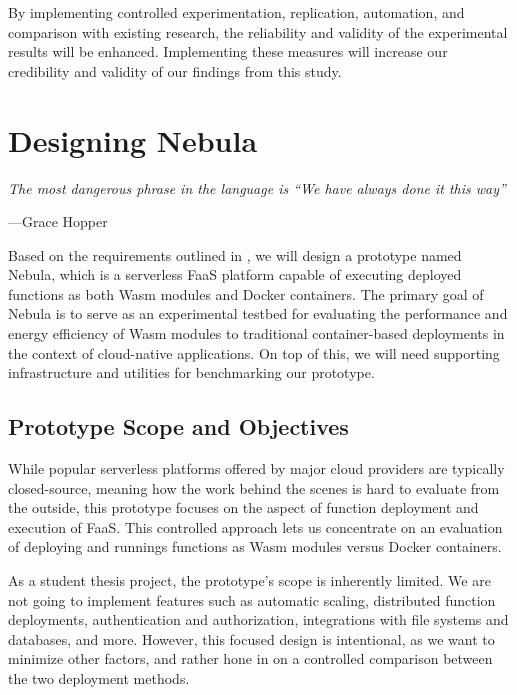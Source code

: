 \documentclass[
  table]{report}
\begin{document}
By implementing controlled experimentation, replication, automation, and
comparison with existing research, the reliability and validity of the
experimental results will be enhanced. Implementing these measures will
increase our credibility and validity of our findings from this study.

\newpage

\chapter{Designing Nebula}
\label{chap:design}

\setlength{} 
\epigraph{\itshape 
The most dangerous phrase in the language is ``We have always done it this way''
}{---Grace Hopper}

Based on the requirements outlined in , we will
design a prototype named Nebula, which is a serverless \ac{FaaS}
platform capable of executing deployed functions as both \ac{Wasm}
modules and Docker containers. The primary goal of Nebula is to serve as
an experimental testbed for evaluating the performance and energy
efficiency of \ac{Wasm} modules to traditional container-based
deployments in the context of cloud-native applications. On top of this,
we will need supporting infrastructure and utilities for benchmarking
our prototype.

\section{Prototype Scope and Objectives}
\label{sect:prototype_scope}

While popular serverless platforms offered by major cloud providers are
typically closed-source, meaning how the work behind the scenes is hard
to evaluate from the outside, this prototype focuses on the aspect of
function deployment and execution of \ac{FaaS}. This controlled approach
lets us concentrate on an evaluation of deploying and runnings functions
as \ac{Wasm} modules versus Docker containers.

As a student thesis project, the prototype's scope is inherently
limited. We are not going to implement features such as automatic
scaling, distributed function deployments, authentication and
authorization, integrations with file systems and databases, and more.
However, this focused design is intentional, as we want to minimize
other factors, and rather hone in on a controlled comparison between the
two deployment methods.
\end{document}
